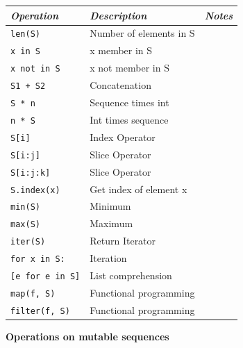 \documentclass[9pt,a4wide]{extarticle}
\begin{document}
\begin{supertabular}{|l|p{12cm}|c|}\hline
{\em Operation}      & {\em Description}        &  {\em Notes} \\ \hline\hline

{\tt len(S)}         & Number of elements in S  &        \\ \hline
{\tt x in S}         & x member in S            &        \\ \hline
{\tt x not in S}     & x not member in S        &        \\ \hline
{\tt S1 + S2}        & Concatenation                       &        \\ \hline
{\tt S * n}          & Sequence times int                  &        \\ \hline
{\tt n * S}          & Int times sequence                  &        \\ \hline
{\tt S[i]}           & Index Operator                      &        \\ \hline
{\tt S[i:j]}         & Slice Operator                      &        \\ \hline
{\tt S[i:j:k]}       & Slice Operator                      &        \\ \hline
{\tt S.index(x)}     & Get index of element x              &        \\ \hline
{\tt min(S)}         & Minimum                             &        \\ \hline
{\tt max(S)}         & Maximum                             &        \\ \hline
{\tt iter(S)}        & Return Iterator                     &        \\ \hline
{\tt for x in S:}    & Iteration                           &        \\ \hline
{\tt [e for e in S]} & List comprehension                  &        \\ \hline
{\tt map(f, S)}      & Functional programming              &        \\ \hline
{\tt filter(f, S)}   & Functional programming              &        \\ \hline
\end{supertabular}



\bigskip
{\bf Operations on mutable sequences}
\end{document}
